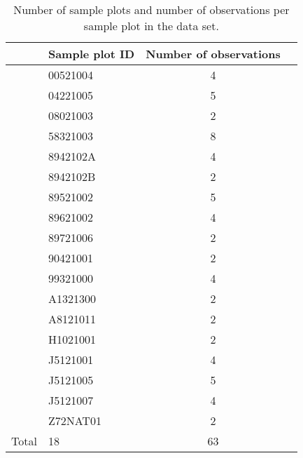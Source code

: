 \newpage{}  %
\begin{singlespace}
  {\tabulinesep=2mm
    \begin{longtabu}{l l S L}
      \caption{Number of sample plots and number of observations per sample plot in the \Beech{} data set. \label{tab:ObservationsCountPerEdvidBeech}} \\
      \toprule
      & Sample plot ID & {Number of observations} &  \\
      \midrule
      \endhead
      \bottomrule
      \endlastfoot
      & 00521004 & 4 \\
      & 04221005 & 5 \\
      & 08021003 & 2 \\
      & 58321003 & 8 \\
      & 8942102A & 4 \\
      & 8942102B & 2 \\
      & 89521002 & 5 \\
      & 89621002 & 4 \\
      & 89721006 & 2 \\
      & 90421001 & 2 \\
      & 99321000 & 4 \\
      & A1321300 & 2 \\
      & A8121011 & 2 \\
      & H1021001 & 2 \\
      & J5121001 & 4 \\
      & J5121005 & 5 \\
      & J5121007 & 4 \\
      & Z72NAT01 & 2 \\
      Total & 18 & 63 \\
    \end{longtabu}
  }
\end{singlespace}

